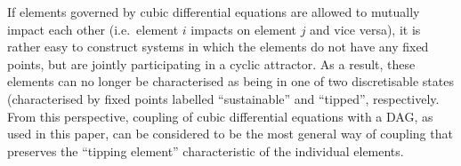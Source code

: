 \documentclass[letterpaper]{article}
\begin{document}
If elements governed by cubic differential equations are allowed to
mutually impact each other (i.e.\ element $i$ impacts on element $j$
and vice versa), it is rather easy to construct systems in which the
elements do not have any fixed points, but are jointly participating
in a cyclic attractor. As a result, these elements can no longer be
characterised as being in one of two discretisable states
(characterised by fixed points labelled ``sustainable'' and
``tipped'', respectively. From this perspective, coupling of cubic
differential equations with a DAG, as used in this paper, can be
considered to be the most general way of coupling that preserves the
``tipping element'' characteristic of the individual elements.











\end{document}
